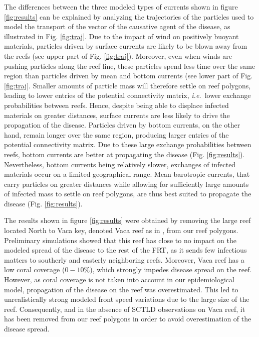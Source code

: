 \documentclass[utf8]{frontiersSCNS}
\newcommand{\ie}{{\it i.e.}\ }
\begin{document}
The differences between the three modeled types of currents shown in figure \ref{fig:results} can be explained by analyzing the trajectories of the particles used to model the transport of the vector of the causative agent of the disease, as illustrated in Fig. \ref{fig:traj}. Due to the impact of wind on positively buoyant materials, particles driven by surface currents are likely to be blown away from the reefs (see upper part of Fig. \ref{fig:traj}). Moreover, even when winds are pushing particles along the reef line, these particles spend less time over the same region than particles driven by mean and bottom currents (see lower part of Fig. \ref{fig:traj}. Smaller amounts of particle mass will therefore settle on reef polygons, leading to lower entries of the potential connectivity matrix, \ie lower exchange probabilities between reefs. Hence, despite being able to displace infected materials on greater distances, surface currents are less likely to drive the propagation of the disease. Particles driven by bottom currents, on the other hand, remain longer over the same region, producing larger entries of the potential connectivity matrix. Due to these large exchange probabilities between reefs, bottom currents are better at propagating the disease (Fig. \ref{fig:results}). Nevertheless, bottom currents being relatively slower, exchanges of infected materials occur on a limited geographical range. Mean barotropic currents, that carry particles on greater distances while allowing for sufficiently large amounts of infected mass to settle on reef polygons, are thus best suited to propagate the disease (Fig. \ref{fig:results}).

The results shown in figure \ref{fig:results} were obtained by removing the large reef located North to Vaca key, denoted Vaca reef as in \cite{frys20}, from our reef polygons. Preliminary simulations showed that this reef has close to no impact on the modeled spread of the disease to the rest of the FRT, as it sends few infectious matters to southerly and easterly neighboring reefs. Moreover, Vaca reef has a low coral coverage ($0-10\%$), which strongly impedes disease spread on the reef. However, as coral coverage is not taken into account in our epidemiological model, propagation of the disease on the reef was overestimated. This led to unrealistically strong modeled front speed variations due to the large size of the reef. Consequently, and in the absence of SCTLD observations on Vaca reef, it has been removed from our reef polygons in order to avoid overestimation of the disease spread.
\end{document}
